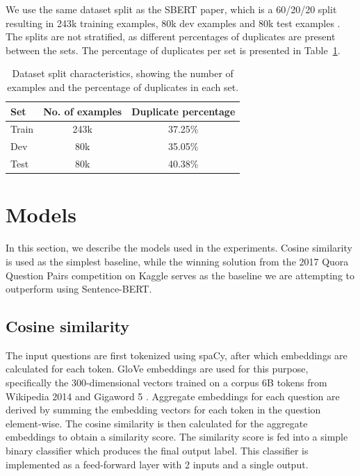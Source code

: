 \documentclass[10pt, a4paper]{article}
\begin{document}
We use the same dataset split as the SBERT paper, which is a 60/20/20 split resulting in 243k training examples, 80k dev examples and 80k test examples \citep{reimers-2019-sentence-bert}.
The splits are not stratified, as different percentages of duplicates are present between the sets. The percentage of duplicates per set is presented in Table~\ref{tab:duplicate-percentages}.

\begin{table}
\caption{Dataset split characteristics, showing the number of examples and the percentage of duplicates in each set.}
\label{tab:duplicate-percentages}
\begin{center}
\begin{tabular}{lcc}
\toprule
\textbf{Set} & \textbf{No. of examples} & \textbf{Duplicate percentage} \\
\midrule
Train & 243k & 37.25\% \\
Dev   & 80k  & 35.05\% \\
Test  & 80k  & 40.38\% \\
\bottomrule
\end{tabular}
\end{center}
\end{table}

\section{Models} \label{models}

In this section, we describe the models used in the experiments.
Cosine similarity is used as the simplest baseline, while the winning solution from the 2017 Quora Question Pairs competition on Kaggle serves as the baseline we are attempting to outperform using Sentence-BERT.

\subsection{Cosine similarity} \label{cosine-similarity}

The input questions are first tokenized using spaCy, after which embeddings are calculated for each token.
GloVe embeddings are used for this purpose, specifically the 300-dimensional vectors trained on a corpus 6B tokens from Wikipedia 2014 and Gigaword 5 \citep{pennington2014glove}.
Aggregate embeddings for each question are derived by summing the embedding vectors for each token in the question element-wise.
The cosine similarity is then calculated for the aggregate embeddings to obtain a similarity score.
The similarity score is fed into a simple binary classifier which produces the final output label.
This classifier is implemented as a feed-forward layer with 2 inputs and a single output.
\end{document}
